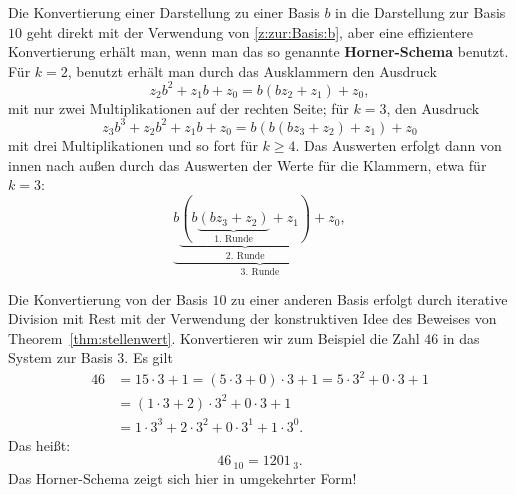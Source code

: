 \begin{bem}
	Die Konvertierung einer Darstellung zu einer Basis $b$ in die Darstellung zur Basis $10$ geht  direkt mit der Verwendung von  \eqref{z:zur:Basis:b}, aber eine effizientere Konvertierung erhält man, wenn man das so genannte \textbf{Horner-Schema} benutzt. 
		Für $k=2$, benutzt erhält man durch das Ausklammern den Ausdruck
	\[
	z_2 b^2 + z_1 b + z_0 = b (b z_2 + z_1) + z_0,
	\]
	 mit nur zwei Multiplikationen auf der rechten Seite;
	für $k=3$, den Ausdruck 
	\[
	z_3 b^3 + z_2 b^2 + z_1 b + z_0 =  b(b (b z_3 + z_2) + z_1 ) + z_0
	\]
	mit drei Multiplikationen und so fort für $k \geq 4$. Das Auswerten erfolgt dann von innen nach außen durch das Auswerten der Werte für die Klammern, etwa für $k=3$:
	\[
\underbrace{b \underbrace{( b \underbrace{(b z_3 + z_2)}_{\text{1. Runde}} + z_1 )}_{\text{2. Runde}}  + z_0,}_{\text{3. Runde}}
	\]
\end{bem}

\begin{bsp}
	Die Konvertierung von der Basis $10$ zu einer anderen Basis erfolgt durch iterative Division mit Rest  mit der Verwendung der konstruktiven Idee des Beweises von Theorem~\ref{thm:stellenwert}. Konvertieren wir zum Beispiel die Zahl $46$ in das System zur Basis $3$. Es gilt
	\begin{align*}
		46 & = 15 \cdot 3 + 1 = (5 \cdot 3 + 0) \cdot 3 + 1 = 5 \cdot 3^2 + 0 \cdot 3 + 1 
		\\ & = (1 \cdot 3 + 2) \cdot 3^2 + 0 \cdot 3 + 1
		\\ & = 1 \cdot 3^3 + 2 \cdot 3^2 + 0 \cdot 3^1 + 1 \cdot 3^0.
	\end{align*}
	Das heißt:
	\[
	46 \, {}_{10}  = 1201 \, {}_{3}. 
	\]
	Das Horner-Schema zeigt sich hier in umgekehrter Form!
\end{bsp}

